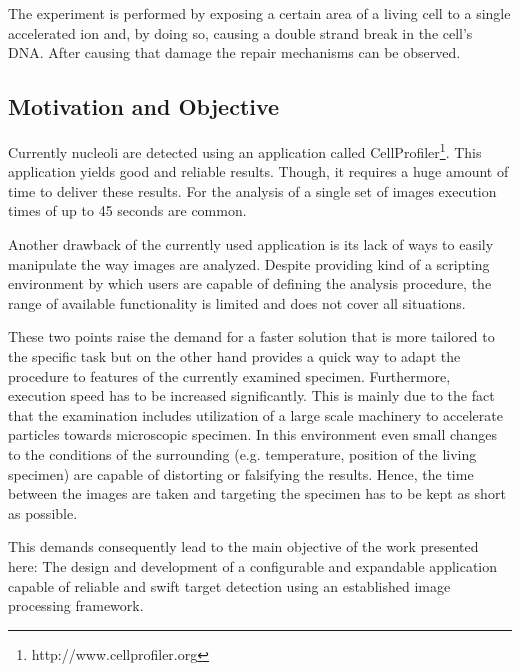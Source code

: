 \documentclass[a4paper, 12pt, twoside]{article}
\begin{document}
The experiment is performed by exposing a certain area of a living cell to a
single accelerated ion and, by doing so, causing a double strand break in the
cell's DNA. After causing that damage the repair mechanisms can be observed.

\subsection{Motivation and Objective}
Currently nucleoli are detected using an application called
CellProfiler\footnote{http://www.cellprofiler.org}. This application yields good
and reliable results. Though, it requires a huge amount of time to deliver
these results. For the analysis of a single set of images execution times of up
to 45 seconds are common.

Another drawback of the currently used application is its lack of ways to easily
manipulate the way images are analyzed. Despite providing kind of a scripting
environment by which users are capable of defining the analysis procedure, the
range of available functionality is limited and does not cover all situations.

These two points raise the demand for a faster solution that is more tailored to
the specific task but on the other hand provides a quick way to adapt the
procedure to features of the currently examined specimen. Furthermore, execution
speed has to be increased significantly. This is mainly due to the fact that the
examination includes utilization of a large scale machinery to accelerate
particles towards microscopic specimen. In this environment even small changes
to the conditions of the surrounding (e.g. temperature, position of the living
specimen) are capable of distorting or falsifying the results. Hence, the time
between the images are taken and targeting the specimen has to be kept as short
as possible.

This demands consequently lead to the main objective of the work presented here:
The design and development of a configurable and expandable application capable
of reliable and swift target detection using an established image processing
framework.
\end{document}
